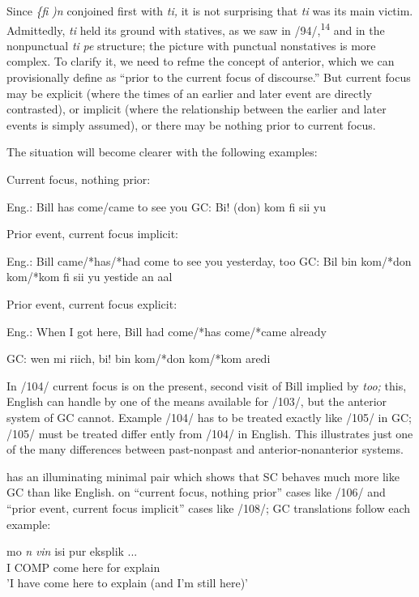Since \textit{\{}\textit{fi} \textit{)n }conjoined first with \textit{ti,} it is not surprising that \textit{ti} was
its main victim. Admittedly, \textit{ti} held its ground with statives, as we saw in /94/,\textsuperscript{1}\textsuperscript{4} and in the nonpunctual \textit{ti} \textit{pe} structure; the picture with punctual nonstatives is more complex. To clarify it, we need to refme the concept of anterior, which we can provisionally define as ``prior to the current focus of discourse.'' But current focus may be explicit (where the times of an earlier and later event are directly contrasted),
or implicit (where the relationship between the earlier and later events is simply assumed), or there may be nothing prior to current focus.

The situation will become clearer with the following examples:

\ea\label{ex:103}
 Current focus, nothing prior:

Eng.: Bill has come/came to see you GC: Bi! (don) kom fi sii yu

\z

\ea\label{ex:104}
 Prior event, current focus implicit:

Eng.: Bill came/*has/*had come to see you yesterday, too GC: Bil bin kom/*don kom/*kom fi sii yu yestide an aal

\z


\ea\label{ex:105}
 Prior event, current focus explicit:

Eng.: When I got here, Bill had come/*has come/*came already

GC: wen mi riich, bi! bin kom/*don kom/*kom aredi


\z


In /104/ current focus is on the present, second visit of Bill implied by \textit{too;} this, English can handle by one of the means available for /103/, but the anterior system of GC cannot. Example /104/ has to be treated exactly like /105/ in GC; /105/ must be treated differ%
ently from /104/ in English. This illustrates just one of the many differences between past-nonpast and anterior-nonanterior systems.

\citet[107]{Corne1977} has an illuminating minimal pair which shows that SC behaves much more like GC than like English. on ``current focus, nothing prior'' cases like /106/ and ``prior event, current focus implicit'' cases like /108/; GC translations follow each example:

\ea\label{ex:106}
\gll mo \textit{n} \textit{vin} isi pur eksplik ...\\
I COMP come here for explain\\
\glt 'I have come here to explain (and I'm still here)'
\z





